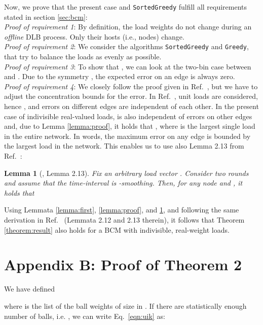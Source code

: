 \documentclass[12pt,psfig,a4]{article}
\newcommand{\sg}{\texttt{SortedGreedy}}
\newtheorem{mylemma}{Lemma}
\theoremstyle{plain}
\begin{document}
\medskip
Now, we prove that the present case and \sg{} fulfill all requirements stated in section \ref{sec:bcm}: \\
\textit{Proof of requirement 1}: By definition, the load weights do not change during an \textit{offline} DLB process. Only their hosts (i.e., nodes) change.   \\
\textit{Proof of requirement 2}: We consider the algorithms \sg{} and \texttt{Greedy}, that try to balance the loads as evenly as possible.  \\
\textit{Proof of requirement 3}: To show that , we can look at the two-bin case between  and . Due to the symmetry , the expected error on an edge is always zero.  \\
\textit{Proof of requirement 4}: We closely follow the proof given in Ref.~\cite{sauerwald2012tight}, but we have to adjust the concentration bounds for the error. In Ref.~\cite{sauerwald2012tight}, unit loads are considered, hence , and errors on different edges are independent of each other. In the present case of indivisible real-valued loads,  is also independent of errors on other edges and, due to Lemma \ref{lemma:proof}, it holds that , where  is the largest single load in the entire network. In words, the maximum error on any edge is bounded by the largest load in the network. This enables us to use also Lemma 2.13 from  Ref.~\cite{sauerwald2012tight}: 
\begin{mylemma}[\cite{sauerwald2012tight}, Lemma 2.13]
\label{lemma:final}
Fix an arbitrary load vector . Consider two rounds  and assume that the time-interval  is -smoothing. Then, for any node  and , it holds that
 	 

\end{mylemma}

Using Lemmata \ref{lemma:first}, \ref{lemma:proof}, and \ref{lemma:final}, and following the same derivation in Ref.~\cite{sauerwald2012tight} (Lemmata 2.12 and 2.13 therein), it follows that Theorem \ref{theorem:result} also holds for a BCM with indivisible, real-weight loads.   \\


\section{Appendix B: Proof of Theorem 2}

We have defined

where  is the list of the ball weights of size  in . If there are statistically enough number of balls, i.e. , we can write Eq.~\ref{eqn:uik} as:
\end{document}
